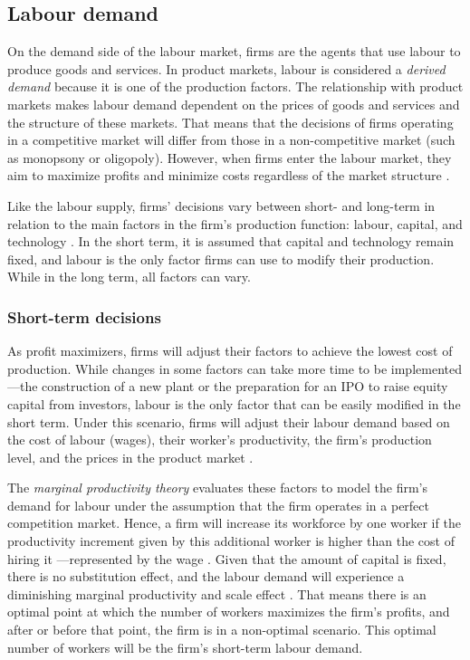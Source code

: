 \subsection{Labour demand}

On the demand side of the labour market, firms are the agents that use labour to produce goods and services. In product markets, labour is considered a \textit{derived demand} because it is one of the production factors. The relationship with product markets makes labour demand dependent on the prices of goods and services and the structure of these markets. That means that the decisions of firms operating in a competitive market will differ from those in a non-competitive market (such as monopsony or oligopoly). However, when firms enter the labour market, they aim to maximize profits and minimize costs regardless of the market structure \citep{Benjamin2021}. 

Like the labour supply, firms' decisions vary between short- and long-term in relation to the main factors in the firm's production function: labour, capital, and technology \citep{Borjas2020}. In the short term, it is assumed that capital and technology remain fixed, and labour is the only factor firms can use to modify their production. While in the long term, all factors can vary. 

\subsubsection{Short-term decisions} 

As profit maximizers, firms will adjust their factors to achieve the lowest cost of production. While changes in some factors can take more time to be implemented —the construction of a new plant or the preparation for an IPO to raise equity capital from investors, labour is the only factor that can be easily modified in the short term. Under this scenario, firms will adjust their labour demand based on the cost of labour (wages), their worker's productivity, the firm's production level, and the prices in the product market \citep{Kaufman2003}. 

The \textit{marginal productivity theory} evaluates these factors to model the firm's demand for labour under the assumption that the firm operates in a perfect competition market. Hence, a firm will increase its workforce by one worker if the productivity increment given by this additional worker is higher than the cost of hiring it —represented by the wage \citep{Kaufman2003,Borjas2020}. Given that the amount of capital is fixed, there is no substitution effect, and the labour demand will experience a diminishing marginal productivity and scale effect \citep{Benjamin2021}. That means there is an optimal point at which the number of workers maximizes the firm's profits, and after or before that point, the firm is in a non-optimal scenario. This optimal number of workers will be the firm's short-term labour demand. 

